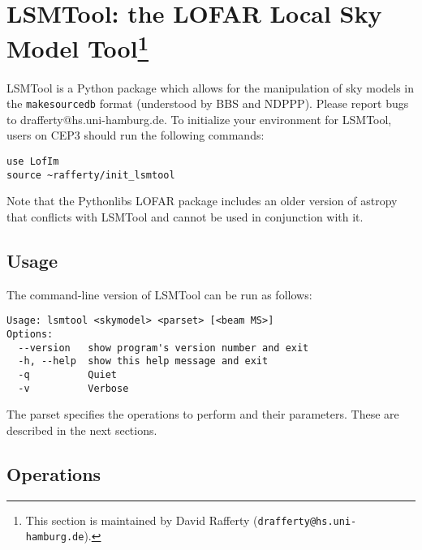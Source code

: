 \documentclass[structabstract]{article}
\begin{document}

\section[LSMTool: the LOFAR Local Sky Model Tool]{LSMTool: the LOFAR Local Sky Model Tool\footnote{This section is maintained by David Rafferty ({\tt drafferty@hs.uni-hamburg.de}).}}
\label{lsmtool}

LSMTool is a Python package which allows for the manipulation of sky models in the \texttt{makesourcedb} format (understood by BBS and NDPPP). Please report bugs to drafferty@hs.uni-hamburg.de. To initialize your environment for LSMTool, users on CEP3 should run the following commands:
\begin{verbatim}
use LofIm
source ~rafferty/init_lsmtool
\end{verbatim}
Note that the Pythonlibs LOFAR package includes an older version of astropy that conflicts with LSMTool and cannot be used in conjunction with it.

\subsection{Usage}
\label{lsmtool:usage}

The command-line version of LSMTool can be run as follows:
\begin{verbatim}
Usage: lsmtool <skymodel> <parset> [<beam MS>]
Options:
  --version   show program's version number and exit
  -h, --help  show this help message and exit
  -q          Quiet
  -v          Verbose
\end{verbatim}
The parset specifies the operations to perform and their parameters. These are described in the next sections.

\subsection{Operations}
\label{lsmtool:operations}
\end{document}
